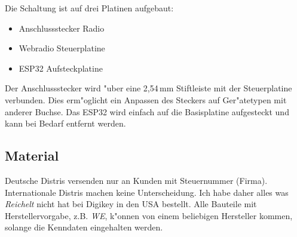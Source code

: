 \documentclass[ngerman,11pt,parskip=half] {scrartcl}
\begin{document}
Die Schaltung ist auf drei Platinen aufgebaut:
\begin{itemize}
\item Anschlussstecker Radio
\item Webradio Steuerplatine
\item ESP32 Aufsteckplatine
\end{itemize}

Der Anschlussstecker wird "uber eine 2,54\,mm Stiftleiste mit der Steuerplatine verbunden. Dies erm"oglicht ein Anpassen des Steckers auf Ger"atetypen mit anderer Buchse. Das ESP32 wird einfach auf die Basisplatine aufgesteckt und kann bei Bedarf entfernt werden.

\subsection{Material} \label{sec:aufbau:material}

Deutsche Distris versenden nur an Kunden mit Steuernummer (Firma). Internationale Distris machen keine Unterscheidung. Ich habe daher alles was \emph{Reichelt} nicht hat bei Digikey in den USA bestellt. Alle Bauteile mit Herstellervorgabe, z.B. \emph{WE}, k"onnen von einem beliebigen Hersteller kommen, solange die Kenndaten eingehalten werden.
\end{document}
